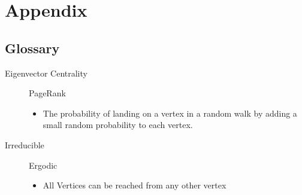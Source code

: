\documentclass[11pt]{article}
\begin{document}
\section{Appendix}
\label{sec:orgbb57846}
\subsection{Glossary}
\label{sec:org0b2e059}
\begin{description}
\item[{Eigenvector Centrality}] PageRank
\begin{itemize}
\item The probability of landing on a vertex in a random walk by adding a small random probability to each vertex.
\end{itemize}
\item[{Irreducible}] Ergodic
\begin{itemize}
\item All Vertices can be reached from any other vertex
\end{itemize}
\end{description}
\end{document}
